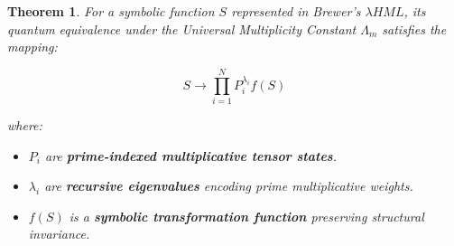 \documentclass{article}
\theoremstyle{plain}
\newtheorem{theorem}{Theorem}
\begin{document}
\begin{theorem}
For a symbolic function \( S \) represented in Brewer’s \(\lambda HML\), its quantum equivalence under the Universal Multiplicity Constant \( \Lambda_m \) satisfies the mapping:

\[
S \to \prod_{i=1}^{N} P_i^{\lambda_i} f(S)
\]

where:
\begin{itemize}
    \item \( P_i \) are \textbf{prime-indexed multiplicative tensor states}.
    \item \( \lambda_i \) are \textbf{recursive eigenvalues} encoding prime multiplicative weights.
    \item \( f(S) \) is a \textbf{symbolic transformation function} preserving structural invariance.
\end{itemize}
\end{theorem}
\end{document}
